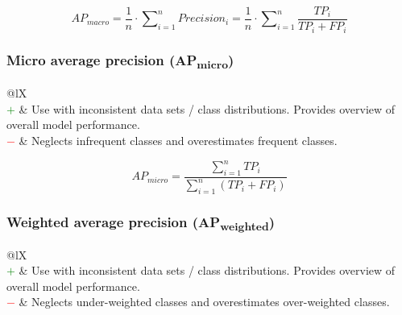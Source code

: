 \documentclass{article}
\begin{document}
\begin{equation}
    \textit{AP}_\textit{macro} = \dfrac{1}{n} \cdot \sum\nolimits_{i = 1}^n \textit{Precision}_i = \dfrac{1}{n} \cdot \sum\nolimits_{i = 1}^n \dfrac{\textit{TP}_i}{\textit{TP}_i + \textit{FP}_i}
%
    \label{equation:MAAP}
\end{equation}


\subsubsection[Micro average precision (APmicro)]{Micro average precision (AP\textsubscript{micro}) \cite{yang1999evaluation, sebastiani2002machine}}

\begin{table}[H]\centering
    \begin{tabularx}{\textwidth}{@{}lX}
         \\
        \textcolor{Green}{$+$} & Use with inconsistent data sets / class distributions. Provides overview of overall model performance. \\
        \textcolor{Red}{$-$}   & Neglects infrequent classes and overestimates frequent classes.
    \end{tabularx}
\end{table}

\begin{equation}
    \textit{AP}_\textit{micro} = \dfrac{\sum\nolimits_{i = 1}^n \textit{TP}_i}{\sum\nolimits_{i = 1}^n (\textit{TP}_i + \textit{FP}_i)}
%
    \label{equation:MIAP}
\end{equation}


\subsubsection[Weighted average precision (APweighted)]{Weighted average precision (AP\textsubscript{weighted}) \cite{han2014rule}}

\begin{table}[H]\centering
    \begin{tabularx}{\textwidth}{@{}lX}
         \\
        \textcolor{Green}{$+$} & Use with inconsistent data sets / class distributions. Provides overview of overall model performance. \\
        \textcolor{Red}{$-$}   & Neglects under-weighted classes and overestimates over-weighted classes.
    \end{tabularx}
\end{table}
\end{document}
